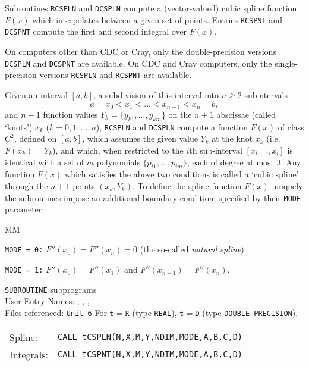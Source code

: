               
      
   
Subroutines {\tt RCSPLN} and {\tt DCSPLN}
compute a (vector-valued) cubic spline function $F(x)$ which
interpolates between a given set of points. Entries {\tt RCSPNT} and
{\tt DCSPNT} compute the first and second integral over $F(x)$.
\par
On computers other than CDC or Cray, only the double-precision versions
{\tt DCSPLN} and {\tt DCSPNT} are available.
On CDC and Cray computers, only the single-precision versions
{\tt RCSPLN} and {\tt RCSPNT} are available.
\par
Given an interval $[a,b]$, a subdivision of this interval into $n \ge 2$
subintervals
$$a = x_{0} < x_{1} < ... < x_{n-1} < x_{n} = b,$$
and $n+1$ function values $Y_{k} = \{y_{k1},\ldots,y_{km}\}$ on the $n+1$
abscissae (called `knots') $x_k$ ($k=0,1,\ldots,n$), {\tt RCSPLN} and
{\tt DCSPLN} compute a function $F(x)$ of class $C^2$, defined on
$[a,b]$, which assumes the given value $Y_k$ at the knot $x_k$ (i.e.
$F(x_k) = Y_k$), and which, when restricted to the $i$th sub-interval
$[x_{i-1}, x_{i}]$ is identical with a set of $m$ polynomials
$\{p_{i1},...,p_{im}\}$,
each of degree at most $3$. Any function $F(x)$ which satisfies the above
two conditions is called a `cubic spline' through the $n + 1$ points
$(x_k, Y_k)$. To define the spline function $F(x)$ uniquely the
subroutines impose an additional boundary condition, specified by their
{\tt MODE} parameter:
\begin{DL}{MM}
\item[] {\tt MODE = 0:} $F''(x_0) = F''(x_n)=0$ (the so-called
{\it natural spline}).
\item[] {\tt MODE = 1:} $F''(x_0) = F''(x_1)$ and
$F''(x_{n-1}) = F''(x_n)$.
\end{DL}
\Structure
{\tt SUBROUTINE} subprograms \\
User Entry Names: , , ,
 \\
Files referenced: {\tt Unit 6}
\Usage
For $\mathtt{t=R}$ (type {\tt REAL}), $\mathtt{t=D}$ (type
{\tt DOUBLE PRECISION}), \\[3mm]
\begin{tabular}{l@{\qquad}l}
Spline:&{\tt CALL tCSPLN(N,X,M,Y,NDIM,MODE,A,B,C,D)}\\
Integrals:&{\tt CALL tCSPNT(N,X,M,Y,NDIM,MODE,A,B,C,D)}
\end{tabular}
